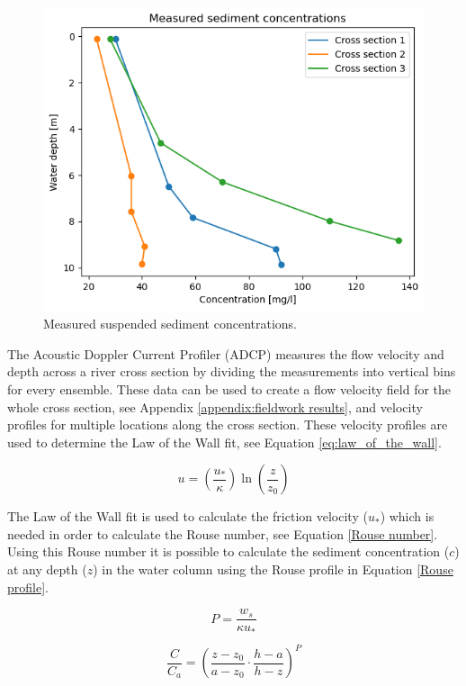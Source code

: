 \begin{figure}[H]
    \centering
    \includegraphics[width=0.75\linewidth]{figures/ch6/Measured_SSC.png}
    \caption{Measured suspended sediment concentrations.}
    \label{fig:Measured suspended sediment concentrations}
\end{figure}

The Acoustic Doppler Current Profiler (ADCP) measures the flow velocity and depth across a river cross section by dividing the measurements into vertical bins for every ensemble. These data can be used to create a flow velocity field for the whole cross section, see Appendix \ref{appendix:fieldwork results}, and velocity profiles for multiple locations along the cross section. These velocity profiles are used to determine the Law of the Wall fit, see Equation \ref{eq:law_of_the_wall}.

\begin{equation}
    u = \left( \frac{u_*}{\kappa} \right) \ln\left( \frac{z}{z_0} \right)
    \label{eq:law_of_the_wall}
\end{equation}

The Law of the Wall fit is used to calculate the friction velocity ($u_*$) which is needed in order to calculate the Rouse number, see Equation \ref{Rouse number}. Using this Rouse number it is possible to calculate the sediment concentration ($c$) at any depth ($z$) in the water column using the Rouse profile in Equation \ref{Rouse profile}.

\begin{equation}
    P = \frac{w_s}{\kappa u_*}
    \label{Rouse number}
\end{equation}

\begin{equation}
    \frac{C}{C_a} = \left( \frac{z - z_0}{a - z_0} \cdot \frac{h - a}{h - z} \right)^{P}
    \label{Rouse profile}
\end{equation}

